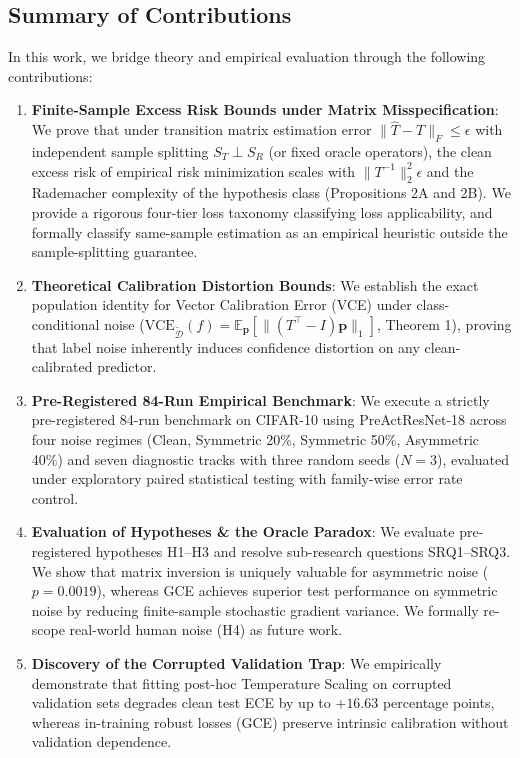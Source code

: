 \documentclass[journal]{IEEEtran}
\theoremstyle{definition}
\begin{document}
\subsection{Summary of Contributions}
In this work, we bridge theory and empirical evaluation through the following contributions:
\begin{enumerate}
    \item \textbf{Finite-Sample Excess Risk Bounds under Matrix Misspecification}: We prove that under transition matrix estimation error $\|\hat{T} - T\|_F \le \epsilon$ with independent sample splitting $S_T \perp S_R$ (or fixed oracle operators), the clean excess risk of empirical risk minimization scales with $\|T^{-1}\|_2^2 \epsilon$ and the Rademacher complexity of the hypothesis class (Propositions 2A and 2B). We provide a rigorous four-tier loss taxonomy classifying loss applicability, and formally classify same-sample estimation as an empirical heuristic outside the sample-splitting guarantee.
    \item \textbf{Theoretical Calibration Distortion Bounds}: We establish the exact population identity for Vector Calibration Error (VCE) under class-conditional noise ($\text{VCE}_{\tilde{\mathcal{D}}}(f) = \mathbb{E}_{\mathbf{p}}[\|(T^\top - I)\mathbf{p}\|_1]$, Theorem 1), proving that label noise inherently induces confidence distortion on any clean-calibrated predictor.
    \item \textbf{Pre-Registered 84-Run Empirical Benchmark}: We execute a strictly pre-registered 84-run benchmark on CIFAR-10 using PreActResNet-18 across four noise regimes (Clean, Symmetric 20\%, Symmetric 50\%, Asymmetric 40\%) and seven diagnostic tracks with three random seeds ($N=3$), evaluated under exploratory paired statistical testing with family-wise error rate control.
    \item \textbf{Evaluation of Hypotheses \& the Oracle Paradox}: We evaluate pre-registered hypotheses H1--H3 and resolve sub-research questions SRQ1--SRQ3. We show that matrix inversion is uniquely valuable for asymmetric noise ($p=0.0019$), whereas GCE achieves superior test performance on symmetric noise by reducing finite-sample stochastic gradient variance. We formally re-scope real-world human noise (H4) as future work.
    \item \textbf{Discovery of the Corrupted Validation Trap}: We empirically demonstrate that fitting post-hoc Temperature Scaling on corrupted validation sets degrades clean test ECE by up to $+16.63$ percentage points, whereas in-training robust losses (GCE) preserve intrinsic calibration without validation dependence.
\end{enumerate}
\end{document}
